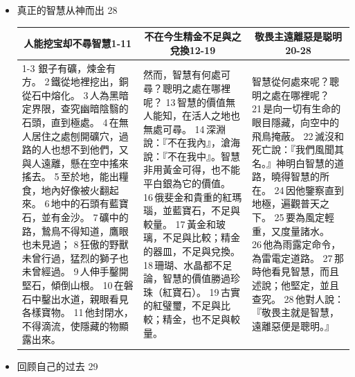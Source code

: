 \begin{itemize}
\item 真正的智慧从神而出 28

\begin{table}[H]
\centering 
\begin{tabular}{p{}|p{15.8em}|p{14.6em}}    \toprule 
\multicolumn{1}{c|}{人能挖宝却不尋智慧1-11}& \multicolumn{1}{c|}{不在今生精金不足與之兌換12-19}&\multicolumn{1}{c}{敬畏主遠離惡是聪明20-28}\\\cline{1-3}
銀子有礦，煉金有方。 2 鐵從地裡挖出，銅從石中熔化。 3 人為黑暗定界限，查究幽暗陰翳的石頭，直到極處。 4 在無人居住之處刨開礦穴，過路的人也想不到他們，又與人遠離，懸在空中搖來搖去。 5 至於地，能出糧食，地內好像被火翻起來。 6 地中的石頭有藍寶石，並有金沙。 7 礦中的路，鷙鳥不得知道，鷹眼也未見過； 8 狂傲的野獸未曾行過，猛烈的獅子也未曾經過。 9 人伸手鑿開堅石，傾倒山根。 10 在磐石中鑿出水道，親眼看見各樣寶物。 11 他封閉水，不得滴流，使隱藏的物顯露出來。
&然而，智慧有何處可尋？聰明之處在哪裡呢？ 13 智慧的價值無人能知，在活人之地也無處可尋。 14 深淵說：『不在我內』，滄海說：『不在我中』。智慧非用黃金可得，也不能平白銀為它的價值。 16 俄斐金和貴重的紅瑪瑙，並藍寶石，不足與較量。 17 黃金和玻璃，不足與比較；精金的器皿，不足與兌換。 18 珊瑚、水晶都不足論，智慧的價值勝過珍珠（紅寶石）。 19 古實的紅璧璽，不足與比較；精金，也不足與較量。
&智慧從何處來呢？聰明之處在哪裡呢？ 21 是向一切有生命的眼目隱藏，向空中的飛鳥掩蔽。 22 滅沒和死亡說：『我們風聞其名。』神明白智慧的道路，曉得智慧的所在。 24 因他鑒察直到地極，遍觀普天之下。 25 要為風定輕重，又度量諸水。 26 他為雨露定命令，為雷電定道路。 27 那時他看見智慧，而且述說；他堅定，並且查究。 28 他對人說：『敬畏主就是智慧，遠離惡便是聰明。』\\ \bottomrule
\end{tabular} 
\end{table}
\item 回顾自己的过去 29


\end{itemize}
